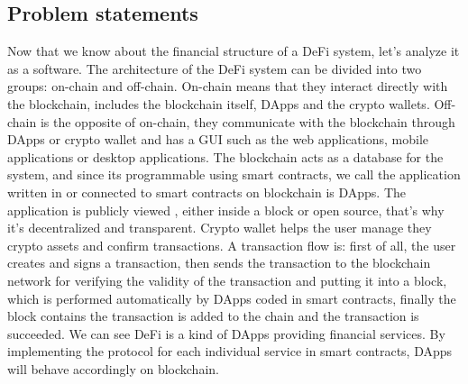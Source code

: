 


\subsection{Problem statements}


Now that we know about the financial structure of a DeFi system, let's analyze it as a software. The architecture of the DeFi system can be divided into two groups: on-chain and off-chain. On-chain means that they interact directly with the blockchain, includes the blockchain itself, DApps and the crypto wallets. Off-chain is the opposite of on-chain, they communicate with the blockchain through DApps or crypto wallet and has a GUI such as the web applications, mobile applications or desktop applications. The blockchain acts as a database for the system, and since its programmable using smart contracts, we call the application written in or connected to smart contracts on blockchain is DApps. The application is publicly viewed , either inside a block or open source, that's why it's decentralized and transparent. Crypto wallet helps the user manage they crypto assets and confirm transactions. A transaction flow is: first of all, the user creates and signs a transaction, then sends the transaction to the blockchain network for verifying the validity of the transaction and putting it into a block, which is performed automatically by DApps coded in smart contracts, finally the block contains the transaction is added to the chain and the transaction is succeeded. We can see DeFi is a kind of DApps providing financial services. By implementing the protocol for each individual service in smart contracts, DApps will behave accordingly on blockchain.


